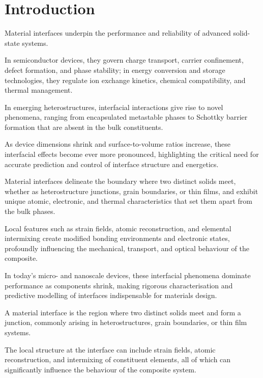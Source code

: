 \chapter{Introduction} \label{chapter:introduction}

\label{para:interface_importance} %

Material interfaces underpin the performance and reliability of advanced solid-state systems.

In semiconductor devices, they govern charge transport, carrier confinement, defect formation, and phase stability; in
energy conversion and storage technologies, they regulate ion exchange kinetics, chemical compatibility, and thermal
management.

In emerging heterostructures, interfacial interactions give rise to novel phenomena, ranging from encapsulated
metastable phases to Schottky barrier formation that are absent in the bulk constituents.

As device dimensions shrink and surface-to-volume ratios increase, these interfacial effects become ever more
pronounced, highlighting the critical need for accurate prediction and control of interface structure and energetics.

\label{para:interface_foundation} %

Material interfaces delineate the boundary where two distinct solids meet, whether as heterostructure junctions, grain
boundaries, or thin films, and exhibit unique atomic, electronic, and thermal characteristics that set them apart from
the bulk phases.

Local features such as strain fields, atomic reconstruction, and elemental intermixing create modified bonding
environments and electronic states, profoundly influencing the mechanical, transport, and optical behaviour of the
composite.

In today's micro- and nanoscale devices, these interfacial phenomena dominate performance as components shrink, making
rigorous characterisation and predictive modelling of interfaces indispensable for materials design.

\label{para:material_interface_definition} %

A material interface is the region where two distinct solids meet and form a junction, commonly arising in
heterostructures, grain boundaries, or thin film systems.

The local structure at the interface can include strain fields, atomic reconstruction, and intermixing of constituent
elements, all of which can significantly influence the behaviour of the composite system.

